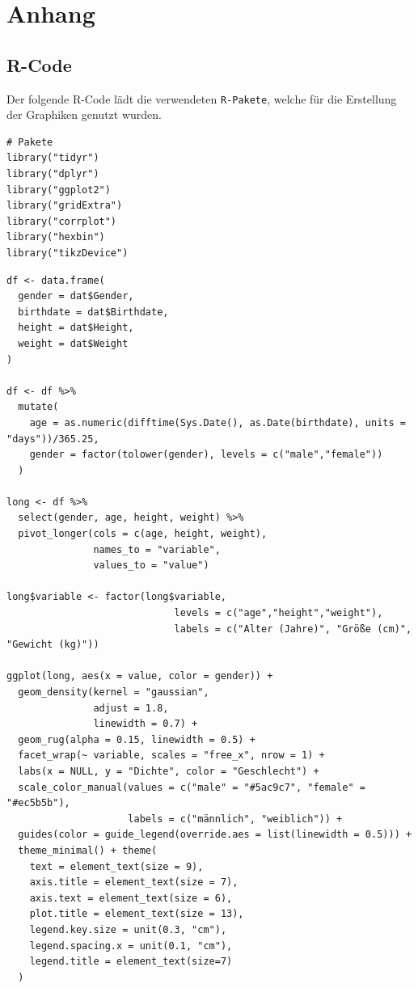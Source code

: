 \documentclass[a4paper,12pt]{article}
\begin{document}
\section{Anhang}


\subsection{R-Code}\label{sec:RCode}
Der folgende R-Code lädt die verwendeten \texttt{R-Pakete}, welche für die Erstellung der Graphiken genutzt wurden.

\begin{lstlisting}[caption={Benötigte Pakete}, label = lst:setting, style=mystyle]
# Pakete
library("tidyr")
library("dplyr")
library("ggplot2")
library("gridExtra")
library("corrplot")
library("hexbin")
library("tikzDevice")
\end{lstlisting}

\begin{lstlisting}[caption={Code für Abbildung \ref{fig:abb1}}, label = lst:abb1, style=mystyle, escapeinside=``]
df <- data.frame(
  gender = dat$Gender,
  birthdate = dat$Birthdate,
  height = dat$Height,
  weight = dat$Weight
)

df <- df %>%
  mutate(
    age = as.numeric(difftime(Sys.Date(), as.Date(birthdate), units = "days"))/365.25,
    gender = factor(tolower(gender), levels = c("male","female"))
  )

long <- df %>%
  select(gender, age, height, weight) %>%
  pivot_longer(cols = c(age, height, weight),
               names_to = "variable",
               values_to = "value")

long$variable <- factor(long$variable,
                             levels = c("age","height","weight"),
                             labels = c("Alter (Jahre)", "Größe (cm)", "Gewicht (kg)"))

ggplot(long, aes(x = value, color = gender)) +
  geom_density(kernel = "gaussian", 
               adjust = 1.8,
               linewidth = 0.7) +
  geom_rug(alpha = 0.15, linewidth = 0.5) +
  facet_wrap(~ variable, scales = "free_x", nrow = 1) +
  labs(x = NULL, y = "Dichte", color = "Geschlecht") +
  scale_color_manual(values = c("male" = "#5ac9c7", "female" = "#ec5b5b"),
                     labels = c("männlich", "weiblich")) +
  guides(color = guide_legend(override.aes = list(linewidth = 0.5))) +
  theme_minimal() + theme(
    text = element_text(size = 9),
    axis.title = element_text(size = 7),
    axis.text = element_text(size = 6),
    plot.title = element_text(size = 13),
    legend.key.size = unit(0.3, "cm"),
    legend.spacing.x = unit(0.1, "cm"),
    legend.title = element_text(size=7)
  )
\end{lstlisting}
\end{document}

